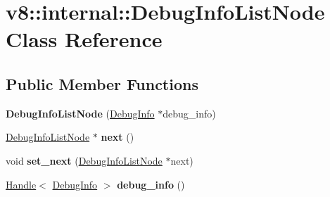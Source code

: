 \hypertarget{classv8_1_1internal_1_1_debug_info_list_node}{}\section{v8\+:\+:internal\+:\+:Debug\+Info\+List\+Node Class Reference}
\label{classv8_1_1internal_1_1_debug_info_list_node}
\subsection*{Public Member Functions}
\begin{DoxyCompactItemize}
\item 
{\bfseries Debug\+Info\+List\+Node} (\hyperlink{classv8_1_1internal_1_1_debug_info}{Debug\+Info} $\ast$debug\+\_\+info)\hypertarget{classv8_1_1internal_1_1_debug_info_list_node_ae87ed88d8d1688aef91989956562a798}{}\label{classv8_1_1internal_1_1_debug_info_list_node_ae87ed88d8d1688aef91989956562a798}

\item 
\hyperlink{classv8_1_1internal_1_1_debug_info_list_node}{Debug\+Info\+List\+Node} $\ast$ {\bfseries next} ()\hypertarget{classv8_1_1internal_1_1_debug_info_list_node_a94d33d31212f6abebe43b36662bbc6c0}{}\label{classv8_1_1internal_1_1_debug_info_list_node_a94d33d31212f6abebe43b36662bbc6c0}

\item 
void {\bfseries set\+\_\+next} (\hyperlink{classv8_1_1internal_1_1_debug_info_list_node}{Debug\+Info\+List\+Node} $\ast$next)\hypertarget{classv8_1_1internal_1_1_debug_info_list_node_a736b7fd7b611bdc285125fa76ede956b}{}\label{classv8_1_1internal_1_1_debug_info_list_node_a736b7fd7b611bdc285125fa76ede956b}

\item 
\hyperlink{classv8_1_1internal_1_1_handle}{Handle}$<$ \hyperlink{classv8_1_1internal_1_1_debug_info}{Debug\+Info} $>$ {\bfseries debug\+\_\+info} ()\hypertarget{classv8_1_1internal_1_1_debug_info_list_node_ad815860a8e9b66ba266340e4870f4489}{}\label{classv8_1_1internal_1_1_debug_info_list_node_ad815860a8e9b66ba266340e4870f4489}

\end{DoxyCompactItemize}
